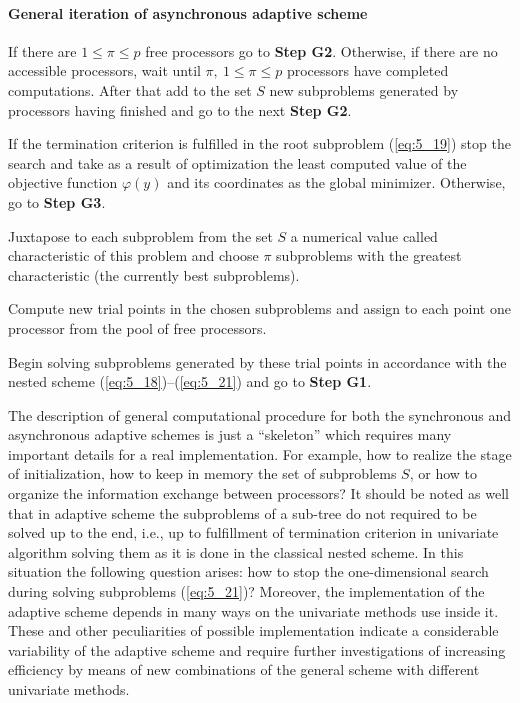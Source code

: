 \paragraph{\textbf{General iteration of asynchronous adaptive scheme}}
\begin{description} 
\item [\textbf{Step G1.}] {If there are $1\leq\pi\leq p$ free processors go to \textbf{Step G2}. Otherwise, if there are no accessible processors, wait until $\pi,\:1\leq\pi\leq p$ processors have completed computations. After that add to the set $S$ new subproblems generated by processors having finished and go to the next \textbf{Step G2}.}
\item [\textbf{Step G2.}] {If the termination criterion is fulfilled in the root subproblem (\ref{eq:5_19}) stop the search and take as a result of optimization the least computed value of the objective function $\varphi(y)$ and its coordinates as the global minimizer. Otherwise, go to \textbf{Step G3}.}
\item [\textbf{Step G3.}]{Juxtapose to each subproblem from the set $S$ a numerical value called characteristic of this problem and choose $\pi$  subproblems with the greatest characteristic (the currently best subproblems).}
\item [\textbf{Step G4.}]{Compute new trial points in the chosen subproblems and assign to each point one processor from the pool of free processors.}
\item [\textbf{Step G5.}]{Begin solving subproblems generated by these trial points in accordance with the nested scheme  (\ref{eq:5_18})--(\ref{eq:5_21}) and go to \textbf{Step G1}.}
\end{description}

The description of general computational procedure for both the synchronous and asynchronous adaptive schemes is just a “skeleton” which requires many important details for a real implementation. For example, how to realize the stage of initialization, how to keep in memory the set of subproblems $S$, or how to organize the information exchange between processors?  It should be noted as well that in adaptive scheme the subproblems of a sub-tree do not required to be solved up to the end, i.e., up to fulfillment of termination criterion in univariate algorithm solving them as it is done in the classical nested scheme. In this situation the following question arises: how to stop the one-dimensional search during solving subproblems (\ref{eq:5_21})?  Moreover, the implementation of the adaptive scheme depends in many ways on the univariate methods use inside it. These and other peculiarities of possible implementation indicate a considerable variability of the adaptive scheme and require further investigations of increasing efficiency by means of new combinations of the general scheme with different univariate methods.

